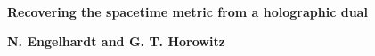 \documentclass[12pt]{article}
\date{}
\begin{document}
{\Large{}\\[2mm]
\textbf{Recovering the spacetime metric from a holographic dual\cite{Engelhardt:2016crc}
}
}

\noindent
\hfill
\textbf{N. Engelhardt and G. T. Horowitz}%

\vspace{12pt}


 

\end{document}
